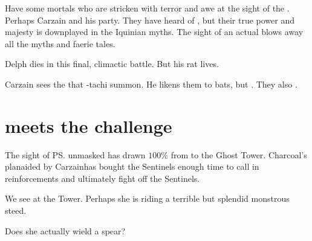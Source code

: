 Have some mortals who are stricken with terror and awe at the sight of the \dragon{}. 
Perhaps Carzain and his party. 
They have heard  of \dragons, but their true power and majesty is downplayed in the Iquinian myths. 
The sight of an actual \dragon{} blows away all the myths and faerie tales. 

Delph dies in this final, climactic battle. 
But his rat lives.

Carzain sees the  that \Achsah-tachi summon. 
He likens them to bats, but . 
They also . 






\section{\Achsah meets the challenge}
The sight of \ps{\Nzessuacrith}{} unmasked has drawn \Achsah{} $100\%$ from \Malcur to the Ghost Tower. 
Charcoal's plan\dash aided by Carzain\dash has bought the Sentinels enough time to call in reinforcements and ultimately fight off the Sentinels. 

We see \Achsah{} at the Tower. 
Perhaps she is riding a terrible but splendid monstrous steed.


Does she actually wield a spear?

